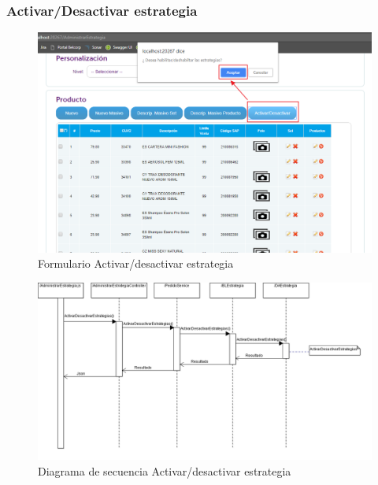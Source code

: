 \documentclass[a4paper,11pt]{paper}
\begin{document}
\subsubsection{Activar/Desactivar estrategia}
\begin{figure}[h]
\centering
\includegraphics[width=1.0\textwidth]{imgs/Estrategia/FormularioActivarDesactivarEstrategia.png}
\caption{Formulario Activar/desactivar estrategia}
\end{figure}

\newpage
\begin{landscape}
\begin{figure}[!h]
\centering
\includegraphics[width=1.5\textwidth]{imgs/Estrategia/ActivarDesactivarEstrategia.png}
\caption{Diagrama de secuencia Activar/desactivar estrategia}
\end{figure}
\end{landscape} 


\newpage
\end{document}
